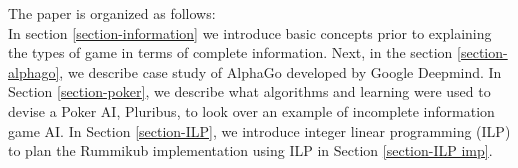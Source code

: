 \documentclass[11pt]{article}
\newcommand{\rr}{\mathbb{R}}
\newcommand{\al}{\alpha}
\DeclareMathOperator{\conv}{conv}
\DeclareMathOperator{\aff}{aff}
\begin{document}
	
	
	
	The paper is organized as follows:\\
	In section \ref{section-information} we introduce basic concepts prior to explaining the types of game in terms of complete information. Next, in the section \ref{section-alphago}, we describe case study of AlphaGo developed by Google Deepmind. In Section \ref{section-poker}, we describe what algorithms and learning were used to devise a Poker AI, Pluribus, to look over an example of incomplete information game AI. In Section \ref{section-ILP}, we introduce integer linear programming (ILP) to plan the Rummikub implementation using ILP in Section \ref{section-ILP imp}.
	
	
	
	
	
\end{document}
